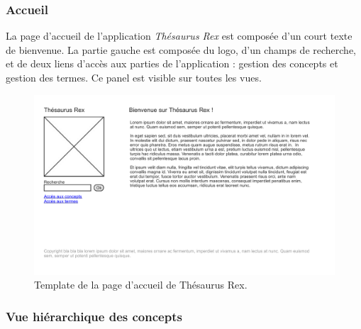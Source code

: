 \subsubsection{Accueil}

La page d'accueil de l'application \emph{Thésaurus Rex} est composée d'un court texte de bienvenue. La partie gauche est composée du logo, d'un champs de recherche, et de deux liens d'accès aux parties de l'application : gestion des concepts et gestion des termes. Ce panel est visible sur toutes les vues.
\begin{figure}[H]
\begin{center}
\includegraphics[width=\textwidth]{files/template_accueil}
\end{center}
\caption{Template de la page d'accueil de Thésaurus Rex.}
\end{figure}

\subsubsection{Vue hiérarchique des concepts}

